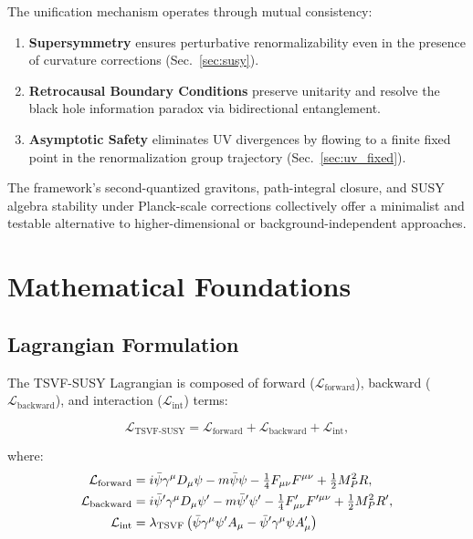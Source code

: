 \documentclass[twocolumn,superscriptaddress,floatfix]{revtex4-2}
\begin{document}
The unification mechanism operates through mutual consistency:
\begin{enumerate}
    \item \textbf{Supersymmetry} ensures perturbative renormalizability even in the presence of curvature corrections (Sec.~\ref{sec:susy}).
    \item \textbf{Retrocausal Boundary Conditions} preserve unitarity and resolve the black hole information paradox via bidirectional entanglement.
    \item \textbf{Asymptotic Safety} eliminates UV divergences by flowing to a finite fixed point in the renormalization group trajectory (Sec.~\ref{sec:uv_fixed}).
\end{enumerate}

The framework’s second-quantized gravitons, path-integral closure, and SUSY algebra stability under Planck-scale corrections collectively offer a minimalist and testable alternative to higher-dimensional or background-independent approaches.
\section{Mathematical Foundations}  
\label{sec:math}   

\subsection{Lagrangian Formulation}  
\label{subsec:lagrangian}    

The TSVF-SUSY Lagrangian is composed of forward ($\mathcal{L}_{\text{forward}}$), backward ($\mathcal{L}_{\text{backward}}$), and interaction ($\mathcal{L}_{\text{int}}$) terms:  

\begin{equation}  
\mathcal{L}_{\text{TSVF-SUSY}} = \mathcal{L}_{\text{forward}} + \mathcal{L}_{\text{backward}} + \mathcal{L}_{\text{int}},  
\label{eq:lagrangian_total}   
\end{equation}  

where:  
\begin{align}  
\mathcal{L}_{\text{forward}} &= i\bar{\psi}\gamma^\mu D_\mu\psi - m\bar{\psi}\psi  
                                - \tfrac{1}{4}F_{\mu\nu}F^{\mu\nu} + \tfrac{1}{2}M_P^2 R, \notag \\
\mathcal{L}_{\text{backward}} &= i\bar{\psi}'\gamma^\mu D_\mu\psi' - m\bar{\psi}'\psi'  
                                - \tfrac{1}{4}F'_{\mu\nu}F'^{\mu\nu} + \tfrac{1}{2}M_P^2 R', \notag \\
\mathcal{L}_{\text{int}} &= \lambda_{\text{TSVF}}\left(\bar{\psi}\gamma^\mu\psi' A_\mu  
                            - \bar{\psi}'\gamma^\mu\psi A'_\mu\right)  
\label{eq:lagrangian_terms}   
\end{align}   
\end{document}
